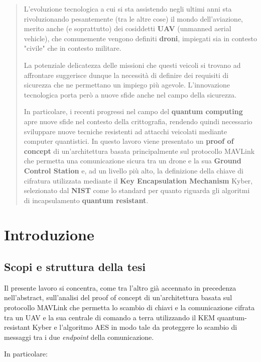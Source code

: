 \documentclass[a4paper, 12pt, oneside]{article}
\begin{document}
\tableofcontents
\newpage

\begin{abstract}
    L'evoluzione tecnologica a cui si sta assistendo negli ultimi anni sta rivoluzionando pesantemente (tra le altre cose) il mondo dell'aviazione, merito anche (e soprattutto) dei cosiddetti \textbf{UAV} (unmanned aerial vehicle), che comunemente vengono definiti \textbf{droni}, impiegati sia in contesto "civile" che in contesto militare. 
    
    La potenziale delicatezza delle missioni che questi veicoli si trovano ad affrontare suggerisce dunque la necessità di definire dei requisiti di sicurezza che ne permettano un impiego più agevole. L'innovazione tecnologica porta però a nuove sfide anche nel campo della sicurezza. 
    
    In particolare, i recenti progressi nel campo del \textbf{quantum computing} apre nuove sfide nel contesto della crittografia, rendendo quindi necessario sviluppare nuove tecniche resistenti ad attacchi veicolati mediante computer quantistici. In questo lavoro viene presentato un \textbf{proof of concept} di un'architettura basata principalmente sul protocollo MAVLink che permetta una comunicazione sicura tra un drone e la sua \textbf{Ground Control Station} e, ad un livello più alto, la definizione della chiave di cifratura utilizzata mediante il \textbf{Key Encapsulation Mechanism} Kyber, selezionato dal \textbf{NIST} come lo standard per quanto riguarda gli algoritmi di incapsulamento \textbf{quantum resistant}.
\end{abstract}
\newpage

\section{Introduzione}

\subsection{Scopi e struttura della tesi}
Il presente lavoro si concentra, come tra l'altro già accennato in precedenza nell'abstract, sull'analisi del proof of concept di un'architettura basata sul protocollo MAVLink che permetta lo scambio di chiavi e la comunicazione cifrata tra un UAV e la sua centrale di comando a terra utilizzando il KEM quantum-resistant Kyber e l'algoritmo AES in modo tale da proteggere lo scambio di messaggi tra i due \textit{endpoint} della comunicazione.

In particolare:
\end{document}
